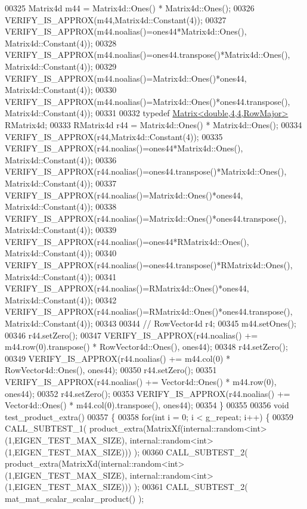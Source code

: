 \begin{DoxyCode}
00325   Matrix4d m44 = Matrix4d::Ones() * Matrix4d::Ones();
00326   VERIFY\_IS\_APPROX(m44,Matrix4d::Constant(4));
00327   VERIFY\_IS\_APPROX(m44.noalias()=ones44*Matrix4d::Ones(), Matrix4d::Constant(4));
00328   VERIFY\_IS\_APPROX(m44.noalias()=ones44.transpose()*Matrix4d::Ones(), Matrix4d::Constant(4));
00329   VERIFY\_IS\_APPROX(m44.noalias()=Matrix4d::Ones()*ones44, Matrix4d::Constant(4));
00330   VERIFY\_IS\_APPROX(m44.noalias()=Matrix4d::Ones()*ones44.transpose(), Matrix4d::Constant(4));
00331 
00332   \textcolor{keyword}{typedef} \hyperlink{group___core___module_class_eigen_1_1_matrix}{Matrix<double,4,4,RowMajor>} RMatrix4d;
00333   RMatrix4d r44 = Matrix4d::Ones() * Matrix4d::Ones();
00334   VERIFY\_IS\_APPROX(r44,Matrix4d::Constant(4));
00335   VERIFY\_IS\_APPROX(r44.noalias()=ones44*Matrix4d::Ones(), Matrix4d::Constant(4));
00336   VERIFY\_IS\_APPROX(r44.noalias()=ones44.transpose()*Matrix4d::Ones(), Matrix4d::Constant(4));
00337   VERIFY\_IS\_APPROX(r44.noalias()=Matrix4d::Ones()*ones44, Matrix4d::Constant(4));
00338   VERIFY\_IS\_APPROX(r44.noalias()=Matrix4d::Ones()*ones44.transpose(), Matrix4d::Constant(4));
00339   VERIFY\_IS\_APPROX(r44.noalias()=ones44*RMatrix4d::Ones(), Matrix4d::Constant(4));
00340   VERIFY\_IS\_APPROX(r44.noalias()=ones44.transpose()*RMatrix4d::Ones(), Matrix4d::Constant(4));
00341   VERIFY\_IS\_APPROX(r44.noalias()=RMatrix4d::Ones()*ones44, Matrix4d::Constant(4));
00342   VERIFY\_IS\_APPROX(r44.noalias()=RMatrix4d::Ones()*ones44.transpose(), Matrix4d::Constant(4));
00343 
00344 \textcolor{comment}{//   RowVector4d r4;}
00345   m44.setOnes();
00346   r44.setZero();
00347   VERIFY\_IS\_APPROX(r44.noalias() += m44.row(0).transpose() * RowVector4d::Ones(), ones44);
00348   r44.setZero();
00349   VERIFY\_IS\_APPROX(r44.noalias() += m44.col(0) * RowVector4d::Ones(), ones44);
00350   r44.setZero();
00351   VERIFY\_IS\_APPROX(r44.noalias() += Vector4d::Ones() * m44.row(0), ones44);
00352   r44.setZero();
00353   VERIFY\_IS\_APPROX(r44.noalias() += Vector4d::Ones() * m44.col(0).transpose(), ones44);
00354 \}
00355 
00356 \textcolor{keywordtype}{void} test\_product\_extra()
00357 \{
00358   \textcolor{keywordflow}{for}(\textcolor{keywordtype}{int} i = 0; i < g\_repeat; i++) \{
00359     CALL\_SUBTEST\_1( product\_extra(MatrixXf(internal::random<int>(1,EIGEN\_TEST\_MAX\_SIZE), 
      internal::random<int>(1,EIGEN\_TEST\_MAX\_SIZE))) );
00360     CALL\_SUBTEST\_2( product\_extra(MatrixXd(internal::random<int>(1,EIGEN\_TEST\_MAX\_SIZE), 
      internal::random<int>(1,EIGEN\_TEST\_MAX\_SIZE))) );
00361     CALL\_SUBTEST\_2( mat\_mat\_scalar\_scalar\_product() );

\end{DoxyCode}

